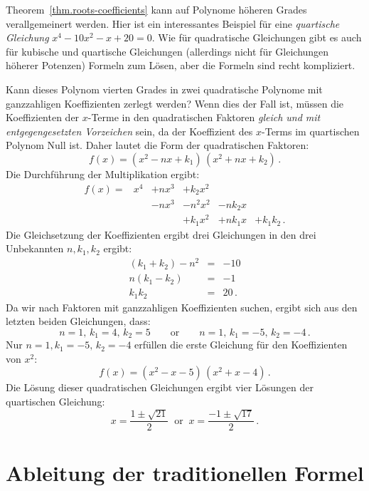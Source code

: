 \begin{example}
Theorem~\ref{thm.roots-coefficients} kann auf Polynome höheren Grades verallgemeinert werden. Hier ist ein interessantes Beispiel für eine \emph{quartische Gleichung} $x^4-10x^2-x+20=0$. Wie für quadratische Gleichungen gibt es auch für kubische und quartische Gleichungen (allerdings nicht für Gleichungen höherer Potenzen) Formeln zum Lösen, aber die Formeln sind recht kompliziert.

Kann dieses Polynom vierten Grades in zwei quadratische Polynome mit ganzzahligen Koeffizienten zerlegt werden? Wenn dies der Fall ist, müssen die Koeffizienten der $x$-Terme in den quadratischen Faktoren \emph{gleich und mit entgegengesetzten Vorzeichen} sein, da der Koeffizient des $x$-Terms im quartischen Polynom Null ist. Daher lautet die Form der quadratischen Faktoren:
\[
f(x) = (x^2 - nx + k_1)\, (x^2 + nx + k_2)\,.
\]
Die Durchführung der Multiplikation ergibt:
\[
\renewcommand{\arraystretch}{1.1}
\begin{array}{rrrrrr}
f(x) = &x^4 & + nx^3 & + k_2 x^2\\
&& -nx^3 &- n^2x^2 &-nk_2x\\
&&&+k_1x^2 &+ nk_1x &+ k_1k_2\,.
\end{array}
\]
Die Gleichsetzung der Koeffizienten ergibt drei Gleichungen in den drei Unbekannten $n,k_1,k_2$ ergibt:
\begin{eqnarray*}
(k_1+k_2)-n^2 &=& -10\\
n(k_1-k_2) &=& -1\\
k_1k_2 &=& 20\,.
\end{eqnarray*}
Da wir nach Faktoren mit ganzzahligen Koeffizienten suchen, ergibt sich aus den letzten beiden Gleichungen, dass:
\[
n=1,\,k_1=4,\,k_2=5  \quad\quad\textrm{or} \quad\quad n=1,\,k_1=-5,\, k_2=-4\,.
\]
Nur $n=1,k_1=-5,\, k_2=-4$ erfüllen die erste Gleichung für den Koeffizienten von $x^2$:
\[
f(x) = (x^2 - x - 5)\, (x^2 + x - 4)\,.
\]
Die Lösung dieser quadratischen Gleichungen ergibt vier Lösungen der quartischen Gleichung:
\[
x = \frac{1\pm\sqrt{21}}{2}  \;\;\textrm{or} \;\; x= \frac{-1\pm\sqrt{17}}{2} \,.
\]
\end{example}

\section{Ableitung der traditionellen Formel}\label{s.general}

